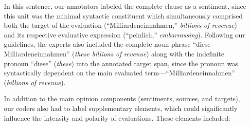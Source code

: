 In this sentence, our annotators labeled the complete clause as a
sentiment, since this unit was the minimal syntactic constituent which
simultaneously comprised both the target of the evaluation
(``Milliardeneinnahmen,'' \emph{billions of revenue}) and its
respective evaluative expression (``peinlich,'' \emph{embarrassing}).
Following our guidelines, the experts also included the complete noun
phrase ``diese Milliardeneinnahmen'' (\emph{these billions of
  revenue}) along with the indefinite pronoun ``diese'' (\emph{these})
into the annotated target span, since the pronoun was syntactically
dependent on the main evaluated term---``Milliardeneinnahmen''
(\emph{billions of revenue}).

In addition to the main opinion components (sentiments, sources, and
targets), our coders also had to label supplementary elements, which
could significantly influence the intensity and polarity of
evaluations.  These elements included:

